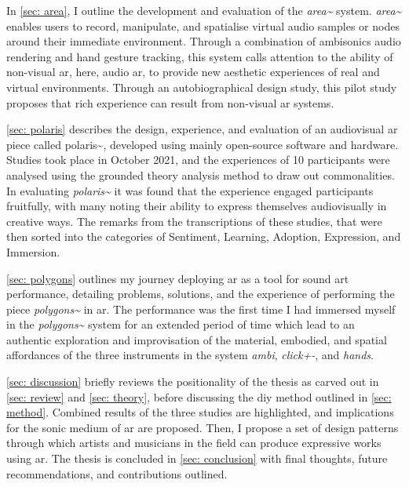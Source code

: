 In \autoref{sec: area}, I outline the development and evaluation of the \textit{area\textasciitilde{}} system. \textit{area\textasciitilde{}} enables users to record, manipulate, and spatialise virtual audio samples or nodes around their immediate environment. Through a combination of ambisonics audio rendering and hand gesture tracking, this system calls attention to the ability of non-visual \ac{ar}, here, audio \ac{ar}, to provide new aesthetic experiences of real and virtual environments. Through an autobiographical design study, this pilot study proposes that rich experience can result from non-visual \ac{ar} systems. 

\autoref{sec: polaris} describes the design, experience, and evaluation of an audiovisual \ac{ar} piece called {polaris\textasciitilde{}}, developed using mainly open-source software and hardware. Studies took place in October 2021, and the experiences of 10 participants were analysed using the grounded theory analysis method to draw out commonalities. In evaluating \textit{polaris\textasciitilde{}} it was found that the experience engaged participants fruitfully, with many noting their ability to express themselves audiovisually in creative ways. The remarks from the transcriptions of these studies, that were then sorted into the categories of Sentiment, Learning, Adoption, Expression, and Immersion. 

\autoref{sec: polygons} outlines my journey deploying \ac{ar} as a tool for sound \ac{art} performance, detailing problems, solutions, and the experience of performing the piece \textit{polygons\textasciitilde{}} in \ac{ar}. The performance was the first time I had immersed myself in the \textit{polygons\textasciitilde{}} system for an extended period of time which lead to an authentic exploration and improvisation of the material, embodied, and spatial affordances of the three instruments in the system \textit{ambi}, \textit{click+-}, and \textit{hands}.

\autoref{sec: discussion} briefly reviews the positionality of the thesis as carved out in \autoref{sec: review} and \autoref{sec: theory}, before discussing the \ac{diy} method outlined in \autoref{sec: method}. Combined results of the three studies are highlighted, and implications for the sonic medium of \ac{ar} are proposed. Then, I propose a set of design patterns through which artists and musicians in the field can produce expressive works using \ac{ar}. The thesis is concluded in \autoref{sec: conclusion} with final thoughts, future recommendations, and contributions outlined.
